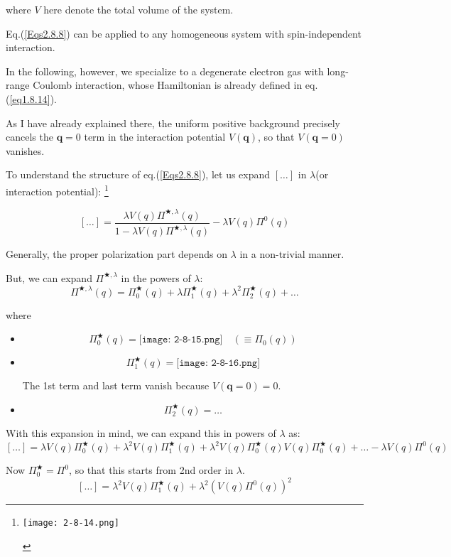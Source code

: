 where $V$ here denote the total volume of the system.

Eq.(\ref{Eqs2.8.8}) can be applied to any homogeneous system with spin-independent interaction.

In the following, however, we specialize to a degenerate electron gas with long-range Coulomb interaction, whose Hamiltonian is already defined in eq.(\ref{eq1.8.14}).

As I have already explained there, the uniform positive background precisely cancels the $\mathbf{q}=0$ term in the interaction potential $V(\mathbf{q})$, so that $V(\mathbf{q}=0)$ vanishes.

To understand the structure of eq.(\ref{Eqs2.8.8}), let us expand $\left[ \ldots \right]$ in $\lambda$(or interaction potential):
\footnote{\begin{center} \label{Fig2.8.14}
\texttt{[image: 2-8-14.png]}
\end{center}}

\[[\ldots] = \frac{\lambda V(q)\Pi^{\bigstar,\lambda}(q)}{1-\lambda V(q)\Pi^{\bigstar,\lambda}(q)} - \lambda V(q)\Pi^0(q)\]

Generally, the proper polarization part depends on $\lambda$ in a non-trivial manner.

But, we can expand $\Pi^{\bigstar,\lambda}$ in the powers of $\lambda$:
\[ \Pi^{\bigstar,\lambda}(q) = \Pi^{\bigstar}_0(q) + \lambda\Pi^{\bigstar}_1(q)+\lambda^2 \Pi^{\bigstar}_2(q) + \ldots \]

where
\begin{itemize}
\item \[\Pi_0^\bigstar(q)= \texttt{[image: 2-8-15.png]}\quad(\equiv \Pi_0(q))\]

\item \[\Pi_1^\bigstar(q) = \texttt{[image: 2-8-16.png]} \]

The 1st term and last term vanish because $V(\mathbf{q}=0)=0$.

\item \[\Pi_2^\bigstar(q) = \ldots\]
\end{itemize}

With this expansion in mind, we can expand this in powers of $\lambda$ as:
\[ [\ldots] = \lambda V(q) \Pi_0^\bigstar(q) + \lambda^2 V(q) \Pi_1^\bigstar(q) + \lambda^2 V(q) \Pi_0^\bigstar(q) V(q) \Pi_0^\bigstar(q) + \ldots - \lambda V(q) \Pi^0(q)\]

Now $\Pi_0^\bigstar = \Pi^0$, so that this starts from 2nd order in $\lambda$.
\[ [\ldots] = \lambda^2 V(q) \Pi_1^\bigstar(q) + \lambda^2 \left( V(q) \Pi^0 (q) \right)^2 \]

